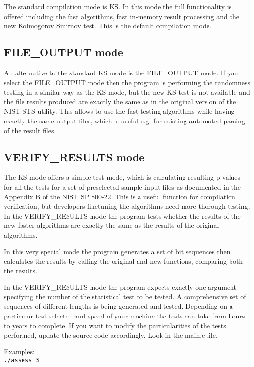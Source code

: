\documentclass[12pt]{article}
\begin{document}
The standard compilation mode is KS. In this mode the full functionality is offered including the fast algorithms, fast in-memory result processing and the new Kolmogorov Smirnov test. This is the default compilation mode.

\subsection*{FILE\_OUTPUT mode}

An alternative to the standard KS mode is the FILE\_OUTPUT mode. If you select the FILE\_OUTPUT mode then the program is performing the randomness testing in a similar way as the KS mode, but the new KS test is not available and the file results produced are exactly the same as in the original version of the NIST STS utility. This allows to use the fast testing algorithms while having exactly the same output files, which is useful e.g. for existing automated parsing of the result files.

\subsection*{VERIFY\_RESULTS mode}

The KS mode offers a simple test mode, which is calculating resulting p-values for all the tests for a set of preselected sample input files as documented in the Appendix B of the NIST SP 800-22. This is a useful function for compilation verification, but developers finetuning the algorithms need more thorough testing. In the VERIFY\_RESULTS mode the program tests whether the results of the new faster algorithms are exactly the same as the results of the original algorithms.

In this very special mode the program generates a set of bit sequences then calculates the results by calling the original and new functions, comparing both the results.

In the VERIFY\_RESULTS mode the program expects exactly one argument specifying the number of the statistical test to be tested. A comprehensive set of sequences of different lengths is being generated and tested. Depending on a particular test selected and speed of your machine the tests can take from hours to years to complete. If you want to modify the particularities of the tests performed, update the source code accordingly. Look in the main.c file.

\bigskip
Examples:\\
\verb+./assess 3+
\end{document}

